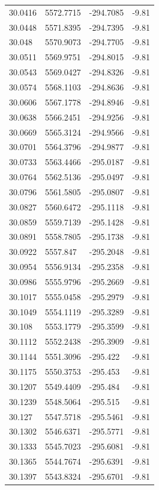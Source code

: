 \begin{table}[H]
\begin{tabular}{llll}
30.0416 & 5572.7715 & -294.7085 & -9.81 \\
30.0448 & 5571.8395 & -294.7395 & -9.81 \\
30.048 & 5570.9073 & -294.7705 & -9.81 \\
30.0511 & 5569.9751 & -294.8015 & -9.81 \\
30.0543 & 5569.0427 & -294.8326 & -9.81 \\
30.0574 & 5568.1103 & -294.8636 & -9.81 \\
30.0606 & 5567.1778 & -294.8946 & -9.81 \\
30.0638 & 5566.2451 & -294.9256 & -9.81 \\
30.0669 & 5565.3124 & -294.9566 & -9.81 \\
30.0701 & 5564.3796 & -294.9877 & -9.81 \\
30.0733 & 5563.4466 & -295.0187 & -9.81 \\
30.0764 & 5562.5136 & -295.0497 & -9.81 \\
30.0796 & 5561.5805 & -295.0807 & -9.81 \\
30.0827 & 5560.6472 & -295.1118 & -9.81 \\
30.0859 & 5559.7139 & -295.1428 & -9.81 \\
30.0891 & 5558.7805 & -295.1738 & -9.81 \\
30.0922 & 5557.847 & -295.2048 & -9.81 \\
30.0954 & 5556.9134 & -295.2358 & -9.81 \\
30.0986 & 5555.9796 & -295.2669 & -9.81 \\
30.1017 & 5555.0458 & -295.2979 & -9.81 \\
30.1049 & 5554.1119 & -295.3289 & -9.81 \\
30.108 & 5553.1779 & -295.3599 & -9.81 \\
30.1112 & 5552.2438 & -295.3909 & -9.81 \\
30.1144 & 5551.3096 & -295.422 & -9.81 \\
30.1175 & 5550.3753 & -295.453 & -9.81 \\
30.1207 & 5549.4409 & -295.484 & -9.81 \\
30.1239 & 5548.5064 & -295.515 & -9.81 \\
30.127 & 5547.5718 & -295.5461 & -9.81 \\
30.1302 & 5546.6371 & -295.5771 & -9.81 \\
30.1333 & 5545.7023 & -295.6081 & -9.81 \\
30.1365 & 5544.7674 & -295.6391 & -9.81 \\
30.1397 & 5543.8324 & -295.6701 & -9.81 \\

\end{tabular}
\end{table}
